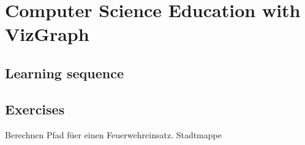 \chapter{Computer Science Education with VizGraph}\label{sec:geoformedu}


\section{Learning sequence}\label{sec:learning}


\section{Exercises}\label{sec:execise}
Berechnen Pfad f\"uer einen Feuerwehreinsatz. Stadtmappe 
